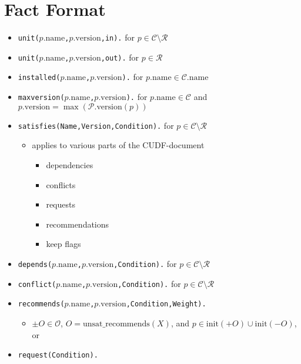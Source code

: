 \documentclass[a4paper,english]{article}
\begin{document}
\section{Fact Format}

\begin{itemize}
  \item \texttt{unit($p.\mathrm{name}$,$p.\mathrm{version}$,in).} for $p\in\mathcal{C}\setminus\mathcal{R}$
  \item \texttt{unit($p.\mathrm{name}$,$p.\mathrm{version}$,out).} for $p\in\mathcal{R}$
  \item \texttt{installed($p.\mathrm{name}$,$p.\mathrm{version}$).} for $p.\mathrm{name}\in \mathcal{C}.\mathrm{name}$
  \item \texttt{maxversion($p.\mathrm{name}$,$p.\mathrm{version}$).} for $p.\mathrm{name} \in \mathcal{C}$ and $p.\mathrm{version}=\max(\mathcal{P}.\mathrm{version}(p))$
  \item \texttt{satisfies(Name,Version,Condition).} for $p\in\mathcal{C}\setminus\mathcal{R}$
    \begin{itemize}
      \item applies to various parts of the CUDF-document
        \begin{itemize}
          \item dependencies
          \item conflicts
          \item requests
          \item recommendations
          \item keep flags
        \end{itemize}
    \end{itemize}
  \item \texttt{depends($p.\mathrm{name}$,$p.\mathrm{version}$,Condition).} for $p\in\mathcal{C}\setminus\mathcal{R}$
  \item \texttt{conflict($p.\mathrm{name}$,$p.\mathrm{version}$,Condition).} for $p\in\mathcal{C}\setminus\mathcal{R}$
  \item \texttt{recommends($p.\mathrm{name}$,$p.\mathrm{version}$,Condition,Weight).}
    \begin{itemize}
      \item $\pm O\in\mathcal{O}$, $O=\mathrm{unsat\_recommends}(X)$, and $p\in\mathrm{init}({+}O)\cup\mathrm{init}({-}O)$, or
    \end{itemize}
  \item \texttt{request(Condition).}
    \begin{itemize}

\end{itemize}
\end{itemize}
\end{document}
